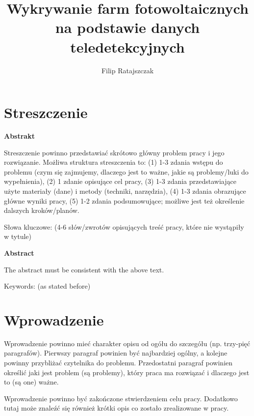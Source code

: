 \documentclass{amuthesis}
\author{Filip Ratajszczak}
\title{Wykrywanie farm fotowoltaicznych na podstawie danych
teledetekcyjnych}
\begin{document}

\titlepage


\hypertarget{streszczenie}{%
\chapter*{Streszczenie}\label{streszczenie}}


\textbf{Abstrakt}

Streszczenie powinno przedstawiać skrótowo główny problem pracy i jego
rozwiązanie. Możliwa struktura streszczenia to: (1) 1-3 zdania wstępu do
problemu (czym się zajmujemy, dlaczego jest to ważne, jakie są
problemy/luki do wypełnienia), (2) 1 zdanie opisujące cel pracy, (3) 1-3
zdania przedstawiające użyte materiały (dane) i metody (techniki,
narzędzia), (4) 1-3 zdania obrazujące główne wyniki pracy, (5) 1-2
zdania podsumowujące; możliwe jest też określenie dalszych
kroków/planów.

Słowa kluczowe: (4-6 słów/zwrotów opisujących treść pracy, które nie
wystąpiły w tytule)

\textbf{Abstract}

The abstract must be consistent with the above text.

Keywords: (as stated before)

\newpage

\sf\tighttoc\doublespacing


\hypertarget{sec-wprowadzenie}{%
\chapter{Wprowadzenie}\label{sec-wprowadzenie}}

Wprowadzenie powinno mieć charakter opisu od ogółu do szczegółu (np.
trzy-pięć paragrafów). Pierwszy paragraf powinien być najbardziej
ogólny, a kolejne powinny przybliżać czytelnika do problemu.
Przedostatni paragraf powinien określić jaki jest problem (są problemy),
który praca ma rozwiązać i dlaczego jest to (są one) ważne.

Wprowadzenie powinno być zakończone stwierdzeniem celu pracy. Dodatkowo
tutaj może znaleźć się również krótki opis co zostało zrealizowane w
pracy.

\end{document}
